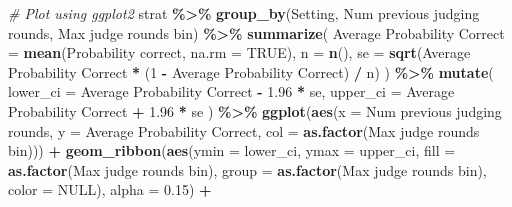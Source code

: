 \documentclass[
]{article}
\newenvironment{Shaded}{\begin{snugshade}}{\end{snugshade}}
\newcommand{\AttributeTok}[1]{\textcolor[rgb]{0.13,0.29,0.53}{#1}}
\newcommand{\CommentTok}[1]{\textcolor[rgb]{0.56,0.35,0.01}{\textit{#1}}}
\newcommand{\ConstantTok}[1]{\textcolor[rgb]{0.56,0.35,0.01}{#1}}
\newcommand{\DecValTok}[1]{\textcolor[rgb]{0.00,0.00,0.81}{#1}}
\newcommand{\FloatTok}[1]{\textcolor[rgb]{0.00,0.00,0.81}{#1}}
\newcommand{\FunctionTok}[1]{\textcolor[rgb]{0.13,0.29,0.53}{\textbf{#1}}}
\newcommand{\NormalTok}[1]{#1}
\newcommand{\OtherTok}[1]{\textcolor[rgb]{0.56,0.35,0.01}{#1}}
\newcommand{\SpecialCharTok}[1]{\textcolor[rgb]{0.81,0.36,0.00}{\textbf{#1}}}
\newcommand{\StringTok}[1]{\textcolor[rgb]{0.31,0.60,0.02}{#1}}
\begin{document}
\begin{Shaded}
\begin{Highlighting}[]
\CommentTok{\# Plot using ggplot2}
\NormalTok{strat }\SpecialCharTok{\%\textgreater{}\%}
  \FunctionTok{group\_by}\NormalTok{(Setting, }\StringTok{\textasciigrave{}}\AttributeTok{Num previous judging rounds}\StringTok{\textasciigrave{}}\NormalTok{, }\StringTok{\textasciigrave{}}\AttributeTok{Max judge rounds bin}\StringTok{\textasciigrave{}}\NormalTok{) }\SpecialCharTok{\%\textgreater{}\%}
  \FunctionTok{summarize}\NormalTok{(}
    \StringTok{\textasciigrave{}}\AttributeTok{Average Probability Correct}\StringTok{\textasciigrave{}} \OtherTok{=} \FunctionTok{mean}\NormalTok{(}\StringTok{\textasciigrave{}}\AttributeTok{Probability correct}\StringTok{\textasciigrave{}}\NormalTok{, }\AttributeTok{na.rm =} \ConstantTok{TRUE}\NormalTok{),}
    \AttributeTok{n =} \FunctionTok{n}\NormalTok{(),}
    \AttributeTok{se =} \FunctionTok{sqrt}\NormalTok{(}\StringTok{\textasciigrave{}}\AttributeTok{Average Probability Correct}\StringTok{\textasciigrave{}} \SpecialCharTok{*}\NormalTok{ (}\DecValTok{1} \SpecialCharTok{{-}} \StringTok{\textasciigrave{}}\AttributeTok{Average Probability Correct}\StringTok{\textasciigrave{}}\NormalTok{) }\SpecialCharTok{/}\NormalTok{ n)}
\NormalTok{  ) }\SpecialCharTok{\%\textgreater{}\%}
  \FunctionTok{mutate}\NormalTok{(}
    \AttributeTok{lower\_ci =} \StringTok{\textasciigrave{}}\AttributeTok{Average Probability Correct}\StringTok{\textasciigrave{}} \SpecialCharTok{{-}} \FloatTok{1.96} \SpecialCharTok{*}\NormalTok{ se,}
    \AttributeTok{upper\_ci =} \StringTok{\textasciigrave{}}\AttributeTok{Average Probability Correct}\StringTok{\textasciigrave{}} \SpecialCharTok{+} \FloatTok{1.96} \SpecialCharTok{*}\NormalTok{ se}
\NormalTok{  ) }\SpecialCharTok{\%\textgreater{}\%}
  \FunctionTok{ggplot}\NormalTok{(}\FunctionTok{aes}\NormalTok{(}\AttributeTok{x =} \StringTok{\textasciigrave{}}\AttributeTok{Num previous judging rounds}\StringTok{\textasciigrave{}}\NormalTok{, }\AttributeTok{y =} \StringTok{\textasciigrave{}}\AttributeTok{Average Probability Correct}\StringTok{\textasciigrave{}}\NormalTok{, }\AttributeTok{col =} \FunctionTok{as.factor}\NormalTok{(}\StringTok{\textasciigrave{}}\AttributeTok{Max judge rounds bin}\StringTok{\textasciigrave{}}\NormalTok{))) }\SpecialCharTok{+}
  \FunctionTok{geom\_ribbon}\NormalTok{(}\FunctionTok{aes}\NormalTok{(}\AttributeTok{ymin =}\NormalTok{ lower\_ci, }\AttributeTok{ymax =}\NormalTok{ upper\_ci, }\AttributeTok{fill =} \FunctionTok{as.factor}\NormalTok{(}\StringTok{\textasciigrave{}}\AttributeTok{Max judge rounds bin}\StringTok{\textasciigrave{}}\NormalTok{), }\AttributeTok{group =} \FunctionTok{as.factor}\NormalTok{(}\StringTok{\textasciigrave{}}\AttributeTok{Max judge rounds bin}\StringTok{\textasciigrave{}}\NormalTok{), }\AttributeTok{color =} \ConstantTok{NULL}\NormalTok{), }\AttributeTok{alpha =} \FloatTok{0.15}\NormalTok{) }\SpecialCharTok{+}

\end{Highlighting}
\end{Shaded}
\end{document}
